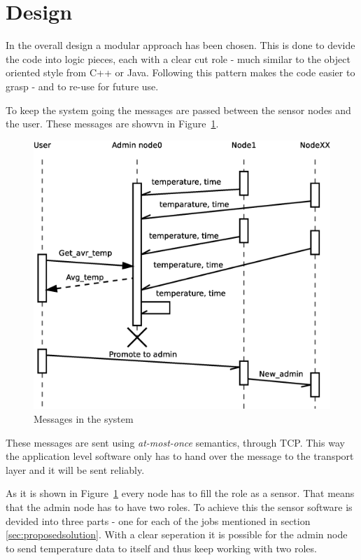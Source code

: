 \section{Design}
\label{sec:design}

In the overall design a modular approach has been chosen. This is done to devide the code into logic pieces, each with a clear cut role - much similar to the object oriented style from C++ or Java. Following this pattern makes the code easier to grasp - and to re-use for future use.


To keep the system going the messages are passed between the sensor nodes and the user. These messages are showvn in Figure~\ref{fig:messages}.
\begin{figure}[ht!]
\centering
    \includegraphics[scale=0.4]{eps/communications2}
\caption{Messages in the system}
\label{fig:messages}
\end{figure}

These messages are sent using \textit{at-most-once} semantics, through TCP. This way the application level software only has to hand over the message to the transport layer and it will be sent reliably.

As it is shown in Figure~\ref{fig:messages} every node has to fill the role as a sensor. That means that the admin node has to have two roles. To achieve this the sensor software is devided into three parts - one for each of the jobs mentioned in section \ref{sec:proposedsolution}. With a clear seperation it is possible for the admin node to send temperature data to itself and thus keep working with two roles.

